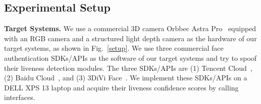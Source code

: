 \subsection{Experimental Setup}
\label{sec:experimental}

\begin{table}[t]
	\caption{Overall Performance of \texttt{DepthFake} attacks with 50 users against three different  liveness detection modules.}
	\vspace{-0.1in}
	\begin{center}
		\label{overall}
	\end{center}
	\vspace{-0.1in}
\end{table}

\textbf{Target Systems.} 
We use a commercial 3D camera Orbbec Astra Pro~\cite{da2020comparison} equipped with an RGB camera and a structured light depth camera as the hardware of our target systems, as shown in Fig.~\ref{setup}. 
We use three commercial face authentication SDKs/APIs as the software of our target systems and try to spoof their liveness detection modules. The three SDKs/APIs are (1) Tencent Cloud~\cite{tencent}, (2) Baidu Cloud~\cite{baidu}, and (3) 3DiVi Face~\cite{3divi}. We implement these SDKs/APIs on a DELL XPS 13 laptop and acquire their liveness confidence scores by calling interfaces.

